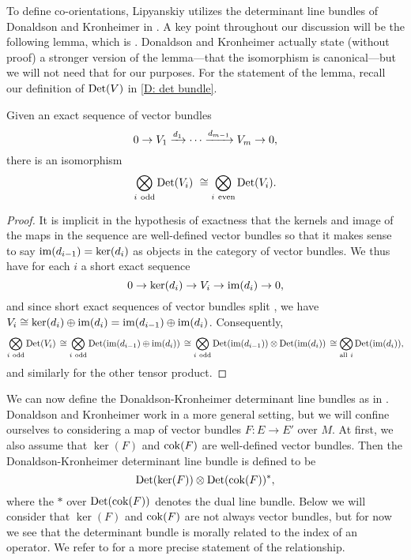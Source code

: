 To define co-orientations, Lipyanskiy utilizes the determinant line bundles of Donaldson and Kronheimer in \cite[Section 5.2.1]{DoKr90}.
A key point throughout our discussion will be the following lemma, which is \cite[Lemma 5.2.2]{DoKr90}.
Donaldson and Kronheimer actually state (without proof) a stronger version of the lemma---that the isomorphism is canonical---but we will not need that for our purposes.
For the statement of the lemma, recall our definition of ${\rm Det}(V)$ in \cref{D: det bundle}.

\begin{lemma}\label{L: det sequence}
	Given an exact sequence of vector bundles
	\[
	0 \to V_1 \xrightarrow{d_1} \cdots \xrightarrow{d_{m-1}} V_m \to 0,
	\]
	there is an isomorphism
	\[
	\bigotimes_{i\ \text{odd}} {\rm Det}(V_i) \ \cong
	\bigotimes_{i\ \text{even}} {\rm Det}(V_i).
	\]
\end{lemma}

\begin{proof}
	It is implicit in the hypothesis of exactness that the kernels and image of the maps in the sequence are well-defined vector bundles so that it makes sense to say $\text{im}(d_{i-1}) = \ker(d_{i})$ as objects in the category of vector bundles.
	We thus have for each $i$ a short exact sequence
	\[
	0 \to \ker(d_i) \to V_i \to \text{im}(d_i) \to 0,
	\]
	and since short exact sequences of vector bundles split \cite[Theorem 3.9.6]{Hus75}, we have $V_i \cong \ker(d_i) \oplus \text{im}(d_i) = \text{im}(d_{i-1}) \oplus \text{im}(d_i)$.
	Consequently,
	\[
	\bigotimes_{i\ \text{odd}} {\rm Det}(V_i)\, \cong
	\bigotimes_{i\ \text{odd}} {\rm Det}(\text{im}(d_{i-1}) \oplus \text{im}(d_i))\, \cong
	\bigotimes_{i\ \text{odd}} {\rm Det}(\text{im}(d_{i-1})) \otimes {\rm Det}(\text{im}(d_i))\, \cong
	\bigotimes_{\text{all}\ i} {\rm Det}(\text{im}(d_{i})),
	\]
	and similarly for the other tensor product.
\end{proof}

We can now define the Donaldson-Kronheimer determinant line bundles as in \cite[Section 5.2.1]{DoKr90}.
Donaldson and Kronheimer work in a more general setting, but we will confine ourselves to considering a map of vector bundles $F \colon E \to E'$ over $M$.
At first, we also assume that $\ker(F)$ and ${\rm cok}(F)$ are well-defined vector bundles.
Then the Donaldson-Kronheimer determinant line bundle is defined to be
$${\rm Det}(\ker(F)) \otimes {\rm Det}({\rm cok}(F))^*,$$
where the $*$ over ${\rm Det}({\rm cok}(F))$ denotes the dual line bundle.
Below we will consider that $\ker(F)$ and ${\rm cok}(F)$ are not always vector bundles, but for now we see that the determinant bundle is morally related to the index of an operator.
We refer to \cite[Section 5.2.1]{DoKr90} for a more precise statement of the relationship.


